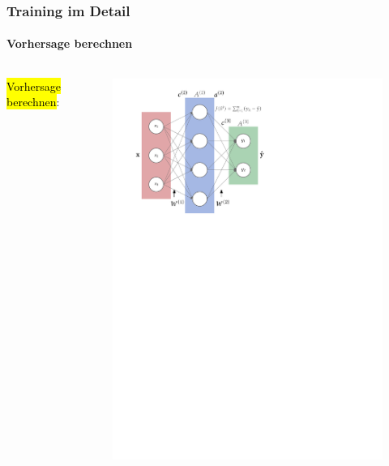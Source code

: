\documentclass[german,aspectratio=169]{beamer}
\begin{document}
\begin{frame}
	\frametitle{Training im Detail}
	\framesubtitle{Vorhersage berechnen}
	\begin{columns}
		\begin{column}{0.5\textwidth}
			\hl{Vorhersage berechnen}:
			\begin{enumerate}[label=(\arabic*)]
			\end{enumerate}
		\end{column}
		\begin{column}{0.5\textwidth}
			\begin{figure}
					\includegraphics[scale=0.68]{fnn}
			\end{figure}
		\end{column}
	\end{columns}
\end{frame}
\end{document}

